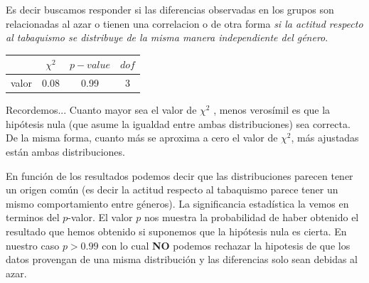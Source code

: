 \documentclass[8pt]{beamer}
\begin{document}
\begin{frame}
Es decir buscamos responder si las diferencias observadas en los grupos son relacionadas al azar o tienen una correlacion o de otra forma \textit{si la actitud respecto al tabaquismo se distribuye de la misma manera independiente del género}. 

\begin{table}
\begin{tabular}{lccc}
\toprule
{} &  $\chi^2$ &  $p-value$ &  $dof$  \\
\midrule
valor &        0.08 &       0.99 &      3  \\
\bottomrule
\end{tabular}
\end{table} 
\pause
\begin{exampleblock}{Recordemos...}
Cuanto mayor sea el valor de $\chi^2$ , menos verosímil es que la hipótesis nula (que asume la igualdad entre ambas distribuciones) sea correcta. De la misma forma, cuanto más se aproxima a cero el valor de $\chi^2$, más ajustadas están ambas distribuciones. 
\end{exampleblock}
\pause
\begin{block}{}
En función de los resultados podemos decir que las distribuciones parecen tener un origen común (es decir la actitud respecto al tabaquismo parece tener un mismo comportamiento entre géneros). La significancia estadística la vemos en terminos del $p$-valor. El valor $p$ nos muestra la probabilidad de haber obtenido el resultado que hemos obtenido si suponemos que la hipótesis nula es cierta. En nuestro caso $p>0.99$ con lo cual \textbf{NO} podemos rechazar la hipotesis de que los datos provengan de una misma distribución y las diferencias solo sean debidas al azar.
\end{block}
\end{frame}
\end{document}
